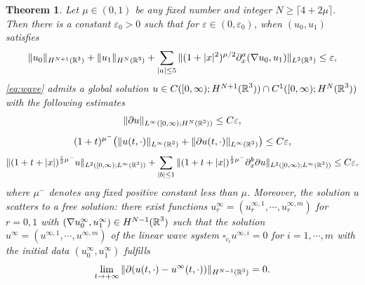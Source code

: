 \documentclass[11pt,twoside]{article}
\def\R{\mathop{\mathbb R\kern 0pt}\nolimits}
\def\f{\frac}
\def\p{\partial}
\def\ve{\varepsilon}
\theoremstyle{plain}
\newtheorem{theorem}{Theorem}[section]
\theoremstyle{definition}
\numberwithin{equation}{section}
\begin{document}
\vskip 0.1cm
\begin{theorem}\label{thm:2}
Let $\mu\in(0,1)$ be any fixed number and integer $N\ge \lceil4+2\mu\rceil$. Then there is a constant $\ve_0>0$ such that
for $\ve\in(0,\ve_0)$,
when $(u_{0},u_{1})$ satisfies
\begin{equation}\label{initial:data2}
\|u_{0}\|_{H^{N+1}(\R^3)}+\|u_1\|_{H^N(\R^3)}+\sum_{|a|\le 5}\|(1+|x|^2)^{\mu/2}\p^a_x(\nabla u _0,u_1)\|_{L^2(\R^3)}\le\ve,
\end{equation}
\eqref{eq:wave} admits a global solution $u\in C([0, \infty);H^{N+1}(\R^3))\cap C^1([0, \infty);H^N(\R^3))$
with the following estimates
\begin{equation}\label{YHCCC-1}
\|\p u\|_{L^\infty([0,\infty);H^N(\R^3))}\le C\varepsilon,
\end{equation}
\begin{equation}\label{YHCCC-2}
(1+t)^{\mu^-}\big(\|u(t,\cdot)\|_{L^\infty(\R^3)}+\|\p u(t,\cdot)\|_{L^\infty(\R^3)}\big)\le C\varepsilon,
\end{equation}
\begin{equation}\label{YHCCC-3}
\|(1+t+|x|)^{\f{1}{2}\mu^-}u\|_{L^{2}([0,\infty); L^\infty(\R^3))}
+\sum_{|b|\le 1}\|(1+t+|x|)^{\f{1}{2}\mu^-}\p_x^b\p u\|_{L^{2}([0,\infty); L^\infty(\R^3))}\le C\varepsilon,
\end{equation}
where $\mu^-$ denotes any fixed positive constant less than $\mu$.
Moreover, the solution $u$ scatters to a free solution: there exist functions $u_{r}^\infty = (u^{\infty,1}_{r},\cdots,u^{\infty,m}_{r})$
for $r = 0,1$ with $(\nabla u_0^\infty, u_1^\infty) \in H^{N-1}(\R^3)$ such that the solution $u^\infty=(u^{\infty,1},\cdots,u^{\infty,m})$ of the linear wave system $\square_{c_i} u^{\infty,i }= 0$ for $i=1,\cdots, m$ with the initial data $(u_0^\infty, u_1^\infty)$ fulfills
	\begin{equation}\label{scatter to a free solution}
	\lim_{t \to +\infty} \|\partial (u(t,\cdot) - u^\infty(t,\cdot))\|_{H^{N-1}(\R^3)} = 0.	
	\end{equation}
\end{theorem}
\end{document}
